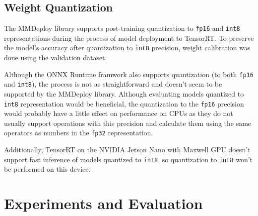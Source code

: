 







\subsection*{Weight Quantization}

The MMDeploy library supports post-training quantization to \texttt{fp16} and
\texttt{int8} representations during the process of model deployment to TensorRT.
To preserve the model's accuracy after quantization to \texttt{int8} precision, weight calibration
was done using the validation dataset.


Although the ONNX Runtime framwork also supports quantization (to both
\texttt{fp16} and \texttt{int8}), the process is not as straightforward and
doesn't seem to be supported by the MMDeploy library. Although evaluating models
quantized to \texttt{int8} representation would be beneficial, the quantization
to the \texttt{fp16} precision would probably have a little effect on performance on CPUs as
they do not usually support operations with this precision and calculate them using the same
operators as numbers in the \texttt{fp32} representation.

Additionally, TensorRT on the NVIDIA Jetson Nano with Maxwell GPU doesn't
support fast inference of models quantized to \texttt{int8}, so quantization to
\texttt{int8} won't be performed on this device.



\section{Experiments and Evaluation}

